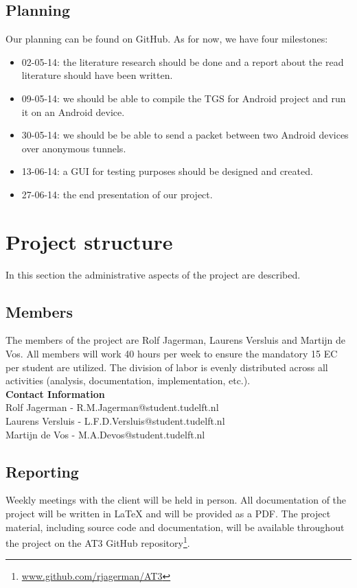 \subsection{Planning}
Our planning can be found on GitHub. As for now, we have four milestones:
\begin{itemize}
\item 02-05-14: the literature research should be done and a report about the read literature should have been written.
\item 09-05-14: we should be able to compile the TGS for Android project and run it on an Android device.
\item 30-05-14: we should be be able to send a packet between two Android devices over anonymous tunnels.
\item 13-06-14: a GUI for testing purposes should be designed and created.
\item 27-06-14: the end presentation of our project.
\end{itemize}

\section{Project structure}

In this section the administrative aspects of the project are described.

\subsection{Members}
The members of the project are Rolf Jagerman, Laurens Versluis and Martijn de Vos. All members will work 40 hours per week to ensure the mandatory 15 EC per student are utilized. The division of labor is evenly distributed across all activities (analysis, documentation, implementation, etc.).\\

\noindent\textbf{Contact Information}\\
Rolf Jagerman - R.M.Jagerman@student.tudelft.nl\\
Laurens Versluis - L.F.D.Versluis@student.tudelft.nl\\
Martijn de Vos - M.A.Devos@student.tudelft.nl

\subsection{Reporting}
Weekly meetings with the client will be held in person. All documentation of the project will be written in {\LaTeX} and will be provided as a PDF. The project material, including source code and documentation, will be available throughout the project on the AT3 GitHub repository\footnote{\href{http://www.github.com/rjagerman/AT3/}{www.github.com/rjagerman/AT3}}.

